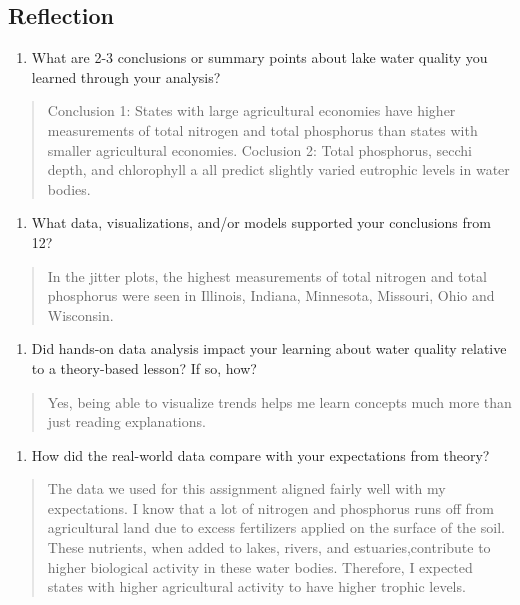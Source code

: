 \documentclass[]{article}
\providecommand{\tightlist}{%
  \setlength{\itemsep}{0pt}\setlength{\parskip}{0pt}}
\begin{document}
\hypertarget{reflection}{%
\subsection{Reflection}\label{reflection}}

\begin{enumerate}
\def\labelenumi{\arabic{enumi}.}
\setcounter{enumi}{11}
\tightlist
\item
  What are 2-3 conclusions or summary points about lake water quality
  you learned through your analysis?
\end{enumerate}

\begin{quote}
Conclusion 1: States with large agricultural economies have higher
measurements of total nitrogen and total phosphorus than states with
smaller agricultural economies. Coclusion 2: Total phosphorus, secchi
depth, and chlorophyll a all predict slightly varied eutrophic levels in
water bodies.
\end{quote}

\begin{enumerate}
\def\labelenumi{\arabic{enumi}.}
\setcounter{enumi}{12}
\tightlist
\item
  What data, visualizations, and/or models supported your conclusions
  from 12?
\end{enumerate}

\begin{quote}
In the jitter plots, the highest measurements of total nitrogen and
total phosphorus were seen in Illinois, Indiana, Minnesota, Missouri,
Ohio and Wisconsin.
\end{quote}

\begin{enumerate}
\def\labelenumi{\arabic{enumi}.}
\setcounter{enumi}{13}
\tightlist
\item
  Did hands-on data analysis impact your learning about water quality
  relative to a theory-based lesson? If so, how?
\end{enumerate}

\begin{quote}
Yes, being able to visualize trends helps me learn concepts much more
than just reading explanations.
\end{quote}

\begin{enumerate}
\def\labelenumi{\arabic{enumi}.}
\setcounter{enumi}{14}
\tightlist
\item
  How did the real-world data compare with your expectations from
  theory?
\end{enumerate}

\begin{quote}
The data we used for this assignment aligned fairly well with my
expectations. I know that a lot of nitrogen and phosphorus runs off from
agricultural land due to excess fertilizers applied on the surface of
the soil. These nutrients, when added to lakes, rivers, and
estuaries,contribute to higher biological activity in these water
bodies. Therefore, I expected states with higher agricultural activity
to have higher trophic levels.
\end{quote}
\end{document}
